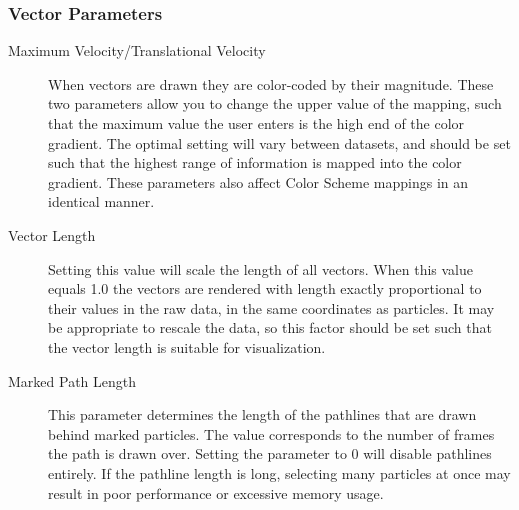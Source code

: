 \subsubsection{Vector Parameters}
\begin{description}
\item[Maximum Velocity/Translational Velocity]
  When vectors are drawn they are color-coded by their magnitude.  These two parameters allow you to change the upper value of the mapping, such that the maximum value the user enters is the high end of the color gradient.  The optimal setting will vary between datasets, and should be set such that the highest range of information is mapped into the color gradient.  These parameters also affect Color Scheme mappings in an identical manner.
  
\item[Vector Length]
   Setting this value will scale the length of all vectors.  When this value equals 1.0 the vectors are rendered with length exactly proportional to their values in the raw data, in the same coordinates as particles.  It may be appropriate to rescale the data, so this factor should be set such that the vector length is suitable for visualization.
\item[Marked Path Length]
This parameter determines the length of the pathlines that are drawn behind marked particles.  The value corresponds to the number of frames the path is drawn over.  Setting the parameter to 0 will disable pathlines entirely.  If the pathline length is long, selecting many particles at once may result in poor performance or excessive memory usage.
\end{description}


